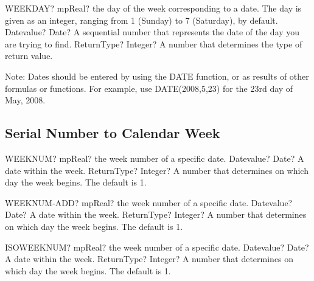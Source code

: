 \begin{mpFunctionsExtract}
	\mpWorksheetFunctionTwoNotImplemented
	{WEEKDAY? mpReal? the day of the week corresponding to a date. The day is given as an integer, ranging from 1 (Sunday) to 7 (Saturday), by default.}
	{Datevalue? Date? A sequential number that represents the date of the day you are trying to find.}
	{ReturnType? Integer? A number that determines the type of return value.}
\end{mpFunctionsExtract}

\vspace{0.3cm}
Note: Dates should be entered by using the DATE function, or as results of other formulas or functions. For example, use DATE(2008,5,23) for the 23rd day of May, 2008.




\subsection{Serial Number to Calendar Week}

\begin{mpFunctionsExtract}
	\mpWorksheetFunctionTwoNotImplemented
	{WEEKNUM? mpReal? the week number of a specific date.}
	{Datevalue? Date? A date within the week. }
	{ReturnType? Integer? A number that determines on which day the week begins. The default is 1.}
\end{mpFunctionsExtract}


\vspace{0.3cm}

\begin{mpFunctionsExtract}
	\mpWorksheetFunctionTwoNotImplemented
	{WEEKNUM-ADD? mpReal? the week number of a specific date.}
	{Datevalue? Date? A date within the week. }
	{ReturnType? Integer? A number that determines on which day the week begins. The default is 1.}
\end{mpFunctionsExtract}


\vspace{0.3cm}

\begin{mpFunctionsExtract}
	\mpWorksheetFunctionTwoNotImplemented
	{ISOWEEKNUM? mpReal? the week number of a specific date.}
	{Datevalue? Date? A date within the week. }
	{ReturnType? Integer? A number that determines on which day the week begins. The default is 1.}
\end{mpFunctionsExtract}

\vspace{0.3cm}


